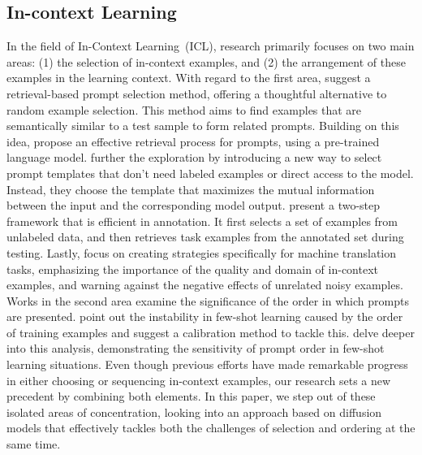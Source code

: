 \documentclass{article}
\begin{document}
\subsection{In-context Learning}
\label{ssec:in-context-learning}
In the field of In-Context Learning~(ICL), research primarily focuses on two main areas: (1) the selection of in-context examples, and (2) the arrangement of these examples in the learning context. With regard to the first area, \citet{liu2021makes} suggest a retrieval-based prompt selection method, offering a thoughtful alternative to random example selection. This method aims to find examples that are semantically similar to a test sample to form related prompts. Building on this idea, \citet{rubin2021learning} propose an effective retrieval process for prompts, using a pre-trained language model. \citet{sorensen2022information} further the exploration by introducing a new way to select prompt templates that don't need labeled examples or direct access to the model. Instead, they choose the template that maximizes the mutual information between the input and the corresponding model output. \citet{su2022selective} present a two-step framework that is efficient in annotation. It first selects a set of examples from unlabeled data, and then retrieves task examples from the annotated set during testing. Lastly, \citet{agrawal2022context} focus on creating strategies specifically for machine translation tasks, emphasizing the importance of the quality and domain of in-context examples, and warning against the negative effects of unrelated noisy examples. Works in the second area examine the significance of the order in which prompts are presented. \citet{zhao2021calibrate} point out the instability in few-shot learning caused by the order of training examples and suggest a calibration method to tackle this. \citet{lu2021fantastically} delve deeper into this analysis, demonstrating the sensitivity of prompt order in few-shot learning situations. Even though previous efforts have made remarkable progress in either choosing or sequencing in-context examples, our research sets a new precedent by combining both elements. In this paper, we step out of these isolated areas of concentration, looking into an approach based on diffusion models that effectively tackles both the challenges of selection and ordering at the same time. 
\end{document}
